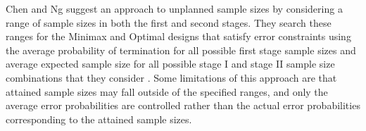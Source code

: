 \documentclass[12pt]{report}\usepackage[]{graphicx}\usepackage[]{color}
\newlength{\li}\setlength{\li}{14.48pt}
\newlength{\di}\setlength{\di}{-3.5mm}
\begin{document}
\indent Chen and Ng \cite{Chen} suggest an approach to unplanned sample sizes by considering a range of sample sizes in both the first and second stages. They search these ranges for the Minimax and Optimal designs that satisfy error constraints using the average probability of termination for all possible first stage sample sizes and average expected sample size for all possible stage I and stage II sample size combinations that they consider \cite{Chen}. Some limitations of this approach are that attained sample sizes may fall outside of the specified ranges, and only the average error probabilities are controlled rather than the actual error probabilities corresponding to the attained sample sizes.    

\end{document}
